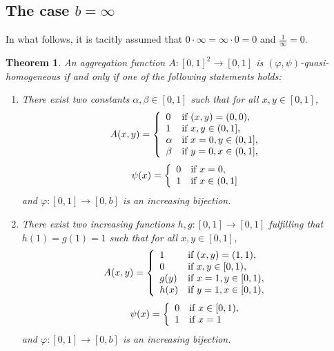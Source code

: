 \documentclass[12pt]{article}
\newtheorem{theorem}{\bf Theorem}[section]
\begin{document}
\subsection{The case $b=\infty$}
In what follows, it is tacitly assumed that $0\cdot \infty=\infty\cdot 0 =0$ and $\frac {1} {\infty}=0$.
\begin{theorem}\label{th2.4}
An aggregation function $A:[0, 1]^2\rightarrow[0, 1]$ is $(\varphi, \psi)$-quasi-homogeneous  if and only if one of the following statements holds:
\begin{enumerate}
\item [(\romannumeral 1)] There exist two constants $\alpha, \beta \in [0, 1]$ such that for all $x, y\in [0,1]$,
$$A(x,y)=\left\{\begin{array}{ll}
0 & {\mbox{\scriptsize\normalsize if  } (x,y)=(0,0)},\\
1 & {\mbox{\scriptsize\normalsize if  } x,y \in(0, 1]},\\
\alpha & {\mbox{\scriptsize\normalsize if  } x=0, y\in(0, 1]},\\
\beta & {\mbox{\scriptsize\normalsize if  } y=0, x\in(0, 1]},
\end{array}
\right.$$
$$\psi(x)=\left\{\begin{array}{ll}
0 & {\mbox{\scriptsize\normalsize if } x=0,}\\
1 & {\mbox{\scriptsize\normalsize if } x \in(0, 1]}
\end{array}
\right.$$
and $\varphi:[0, 1] \rightarrow[0, b]$ is an increasing bijection.
\item [(\romannumeral 2)] There exist two increasing functions $h, g : [0, 1] \rightarrow[0, 1]$ fulfilling that $h(1)=g(1)=1$ such that for all $x, y\in [0,1]$,
$$A(x,y)=\left\{\begin{array}{ll}
1 & {\mbox{\scriptsize\normalsize if  } (x,y)=(1,1)},\\
0 & {\mbox{\scriptsize\normalsize if  } x,y \in[0, 1)},\\
g(y) & {\mbox{\scriptsize\normalsize if  } x=1, y\in[0, 1)},\\
h(x) & {\mbox{\scriptsize\normalsize if  } y=1, x\in[0, 1)},
\end{array}
\right.$$
$$\psi(x)=\left\{\begin{array}{ll}
0 & {\mbox{\scriptsize\normalsize if } x\in[0, 1),}\\
1 & {\mbox{\scriptsize\normalsize if } x=1}
\end{array}
\right.$$
and $\varphi:[0, 1] \rightarrow[0, b]$ is an increasing bijection.
\end{enumerate}
\end{theorem}
\end{document}
